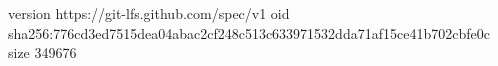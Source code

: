 version https://git-lfs.github.com/spec/v1
oid sha256:776cd3ed7515dea04abac2cf248c513c633971532dda71af15ce41b702cbfe0c
size 349676
